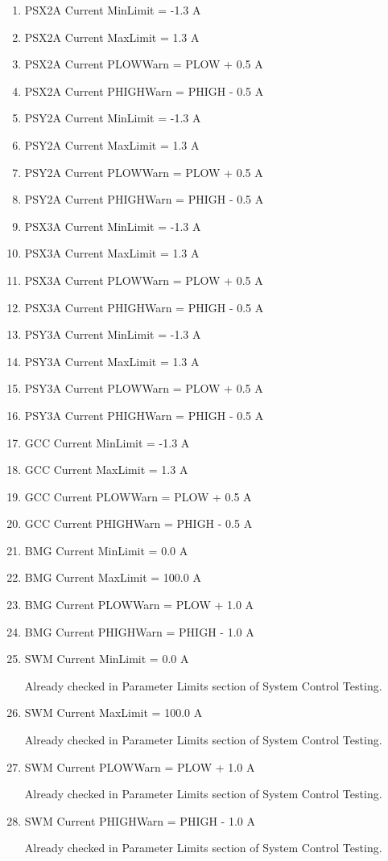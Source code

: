 \documentclass[11pt]{book}		%
\begin{document}
\begin{enumerate}
 \item PSX2A Current MinLimit = -1.3 A
 \item PSX2A Current MaxLimit = 1.3 A
 \item PSX2A Current PLOWWarn = PLOW + 0.5 A
 \item PSX2A Current PHIGHWarn = PHIGH - 0.5 A
 \item PSY2A Current MinLimit = -1.3 A
 \item PSY2A Current MaxLimit = 1.3 A
 \item PSY2A Current PLOWWarn = PLOW + 0.5 A
 \item PSY2A Current PHIGHWarn = PHIGH - 0.5 A
 \item PSX3A Current MinLimit = -1.3 A
 \item PSX3A Current MaxLimit = 1.3 A
 \item PSX3A Current PLOWWarn = PLOW + 0.5 A
 \item PSX3A Current PHIGHWarn = PHIGH - 0.5 A
 \item PSY3A Current MinLimit = -1.3 A
 \item PSY3A Current MaxLimit = 1.3 A
 \item PSY3A Current PLOWWarn = PLOW + 0.5 A
 \item PSY3A Current PHIGHWarn = PHIGH - 0.5 A
 \item GCC Current MinLimit = -1.3 A
 \item GCC Current MaxLimit = 1.3 A
 \item GCC Current PLOWWarn = PLOW + 0.5 A
 \item GCC Current PHIGHWarn = PHIGH - 0.5 A
 \item BMG Current MinLimit = 0.0 A
 \item BMG Current MaxLimit = 100.0 A
 \item BMG Current PLOWWarn = PLOW + 1.0 A
 \item BMG Current PHIGHWarn = PHIGH - 1.0 A
 \item SWM Current MinLimit = 0.0 A

\color{red}
Already checked in Parameter Limits section of System Control Testing.
\color{black}

 \item SWM Current MaxLimit = 100.0 A

\color{red}
Already checked in Parameter Limits section of System Control Testing.
\color{black}

 \item SWM Current PLOWWarn = PLOW + 1.0 A

\color{red}
Already checked in Parameter Limits section of System Control Testing.
\color{black}

 \item SWM Current PHIGHWarn = PHIGH - 1.0 A

\color{red}
Already checked in Parameter Limits section of System Control Testing.
\color{black}

\end{enumerate}
\end{document}
